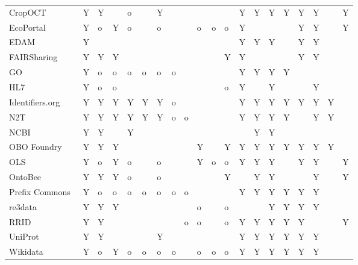 \begin{table}
\begin{tabular}{llllllllllllllllllll}
CropOCT~\cite{Arnaud2020} & Y & Y &  & o &  & Y &  &  &  &  &  & Y & Y & Y & Y & Y & Y &  & Y \\
EcoPortal~\cite{Kechagioglou2021} & Y & o & Y & o &  & o &  &  & o & o & o & Y &  &  &  & Y & Y &  & Y \\
EDAM~\cite{Ison2013} & Y &  &  &  &  &  &  &  &  &  &  & Y & Y & Y &  & Y & Y &  &  \\
FAIRSharing~\cite{Sansone2019} & Y & Y & Y &  &  &  &  &  &  &  & Y & Y &  &  &  & Y & Y &  &  \\
GO~\cite{TheGeneOntologyConsortium2019} & Y & o & o & o & o & o & o &  &  &  &  & Y & Y & Y & Y &  &  &  &  \\
HL7~\cite{Bender2013} & Y & o & o &  &  &  &  &  &  &  & o & Y &  & Y &  &  & Y &  &  \\
Identifiers.org~\cite{Juty2012} & Y & Y & Y & Y & Y & Y & o &  &  &  &  & Y & Y & Y & Y & Y & Y & Y &  \\
N2T~\cite{Wimalaratne2018} & Y & Y & Y & Y & Y & Y & o & o &  &  &  & Y & Y & Y & Y &  & Y & Y &  \\
NCBI~\cite{Clark2016} & Y & Y &  & Y &  &  &  &  &  &  &  &  & Y & Y &  &  &  &  &  \\
OBO Foundry~\cite{Jackson2021} & Y & Y & Y &  &  &  &  &  & Y &  & Y & Y & Y & Y & Y & Y & Y & Y &  \\
OLS~\cite{Cote2006a} & Y & o & Y & o &  & o &  &  & Y & o & o & Y & Y & Y &  & Y & Y &  & Y \\
OntoBee~\cite{Ong2017} & Y & Y & Y & o &  & o &  &  &  &  & Y &  & Y & Y &  &  & Y &  & Y \\
Prefix Commons~\cite{prefixcommons} & Y & o & o & o & o & o & o & o &  &  &  & Y & Y & Y & Y & Y & Y &  &  \\
re3data~\cite{Pampel2013} & Y & Y & Y &  &  &  &  &  & o &  & o &  &  & Y & Y & Y & Y &  &  \\
RRID & Y & Y &  &  &  &  &  & o & o &  & o & Y & Y & Y & Y & Y &  &  & Y \\
UniProt~\cite{Bateman2021} & Y & Y &  &  &  & Y &  &  &  &  &  & Y & Y & Y & Y & Y & Y &  &  \\
Wikidata~\cite{Waagmeester2020} & Y & o & Y & o & o & o & o &  & o & o & o & Y & Y & Y & Y & Y & Y &  &  \\
\bottomrule
\end{tabular}
\end{table}
